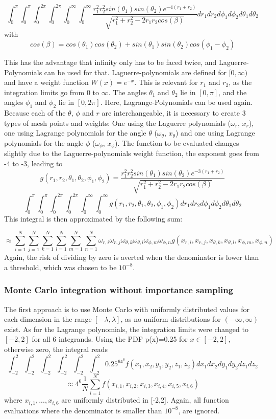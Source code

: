 \documentclass[10pt,a4paper]{article}
\begin{document}
$$
\int_
{0}^{\pi}\int_{0}^{\pi}\int_{0}^{2\pi}\int_{0}^{2\pi}\int_{0}^{\infty}\int_{0}^{\infty}
\frac{r_1^2r_2^2sin(\theta_1)sin(\theta_2)e^{-4(r_1+r_2)}}{\sqrt{r_1^2+r_2^2-2r_1r_2cos(\beta)}}dr_1dr_2d\phi_1d\phi_2d\theta_1d\theta_2
$$
with
$$
cos(\beta)=cos(\theta_1)cos(\theta_2)+sin(\theta_1)sin(\theta_2)cos(\phi_1-\phi_2)
$$

This has the advantage that infinity only has to be faced twice, and Laguerre-Polynomials can be used for that. Laguerre-polynomials are defined for $[0,\infty)$ and have a weight function $W(x)=e^{-x}$. This is relevant for $r_1$ and $r_2$, as the integration limits go from $0$ to $\infty$. The angles $\theta_1$ and $\theta_2$ lie in $[0,\pi]$, and the angles $\phi_1$ and $\phi_2$  lie in $[0,2\pi]$. Here, Lagrange-Polynomials can be used again. Because each of the $\theta$, $\phi$ and $r$ are interchangeable, it is necessary to create 3 types of mesh points and weights: One using the Laguerre polynomials  ($\omega_r$, $x_r$), one using Lagrange polynomials for the angle $\theta$ ($\omega_\theta$, $x_\theta$) and one using Lagrange polynomials for the angle $\phi$ ($\omega_\phi$, $x_\phi$). The function to be evaluated changes slightly due to the Laguerre-polynomials weight function, the exponent goes from -4 to -3, leading to
$$g(r_1,r_2,\theta_1,\theta_2,\phi_1,\phi_2)=\frac{r_1^2r_2^2sin(\theta_1)sin(\theta_2)e^{-3(r_1+r_2)}}{\sqrt{r_1^2+r_2^2-2r_1r_2cos(\beta)}}$$
$$\int_{0}^{\pi}\int_{0}^{\pi}\int_{0}^{2\pi}\int_{0}^{2\pi}\int_{0}^{\infty}\int_{0}^{\infty}
g(r_1,r_2,\theta_1,\theta_2,\phi_1,\phi_2)dr_1dr_2d\phi_1d\phi_2d\theta_1d\theta_2$$
This integral is then approximated by the following sum:

$$
\approx \sum_{i=1}^N \sum_{j=1}^N \sum_{k=1}^N \sum_{l=1}^N \sum_{m=1}^N \sum_{n=1}^N \omega_{r,i} \omega_{r,j} \omega_{\theta ,k} \omega_{\theta ,l} \omega_{\phi ,m} \omega_{\phi ,n} g(x_{r,i},x_{r,j},x_{\theta ,k},x_{\theta ,l},x_{\phi ,m},x_{\phi ,n})
$$
Again, the risk of dividing by zero is averted when the denominator  is lower than a threshold, which was chosen to be $10^{-8}.$
\subsubsection{Monte Carlo integration without importance sampling}
The first approach is to use Monte Carlo with uniformly distributed values for each dimension in the range $[-\lambda,\lambda]$, as no uniform distributions for $(-\infty,\infty)$ exist. As for the Lagrange polynomials, the integration limits were changed  to $[-2,2]$ for all 6 integrands. Using the PDF p(x)=0.25 for $x\in [-2,2]$, otherwise zero, the integral reads 
$$\int_{-2}^{2}\int_{-2}^{2}\int_{-2}^{2}\int_{-2}^{2}\int_{-2}^{2}\int_{-2}^{2}0.25^64^6f(x_1,x_2,y_1,y_2,z_1,z_2)dx_1dx_2dy_1dy_2dz_1dz_2$$
$$\approx4^6\frac{1}{N}\sum_{i=1}^{N}f(x_{i,1},x_{i,2},x_{i,3},x_{i,4},x_{i,5},x_{i,6})$$
where $x_{i,1},...,x_
{i,6}$ are uniformly distributed in  [-2,2]. Again, all function evaluations where the denominator is smaller than $10^{-8}$, are ignored.
\end{document}
